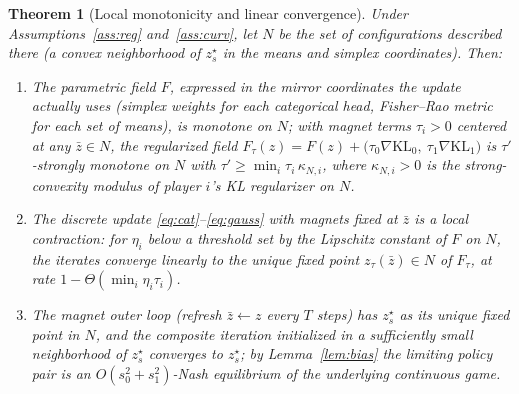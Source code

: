 \documentclass[11pt]{article}
\newtheorem{theorem}{Theorem}
\theoremstyle{definition}
\newcommand{\KL}{\mathrm{KL}}
\begin{document}
\begin{theorem}[Local monotonicity and linear convergence]\label{thm:local}
Under Assumptions~\ref{ass:reg} and~\ref{ass:curv}, let $N$ be the set of
configurations described there (a convex neighborhood of $z^\star_s$ in the
means and simplex coordinates). Then:
\begin{enumerate}
\item[(i)] The parametric field $F$, expressed in the mirror coordinates the
update actually uses (simplex weights for each categorical head, Fisher--Rao
metric for each set of means), is monotone on $N$; with magnet terms
$\tau_i > 0$ centered at any $\bar z \in N$, the regularized field
$F_\tau(z) = F(z) + \big(\tau_0 \nabla \KL_0,\ \tau_1 \nabla \KL_1\big)$ is
$\tau'$-strongly monotone on $N$ with
$\tau' \ge \min_i \tau_i\, \kappa_{N,i}$, where $\kappa_{N,i} > 0$ is the
strong-convexity modulus of player $i$'s KL regularizer on $N$.
\item[(ii)] The discrete update \eqref{eq:cat}--\eqref{eq:gauss} with magnets
fixed at $\bar z$ is a local contraction: for $\eta_i$ below a threshold set by
the Lipschitz constant of $F$ on $N$, the iterates converge linearly to the
unique fixed point $z_\tau(\bar z) \in N$ of $F_\tau$, at rate
$1 - \Theta(\min_i \eta_i \tau_i)$.
\item[(iii)] The magnet outer loop (refresh $\bar z \leftarrow z$ every $T$
steps) has $z^\star_s$ as its unique fixed point in $N$, and the composite
iteration initialized in a sufficiently small neighborhood of $z^\star_s$
converges to $z^\star_s$; by Lemma~\ref{lem:bias} the limiting policy pair is
an $O(s_0^2 + s_1^2)$-Nash equilibrium of the underlying continuous game.
\end{enumerate}
\end{theorem}
\end{document}
